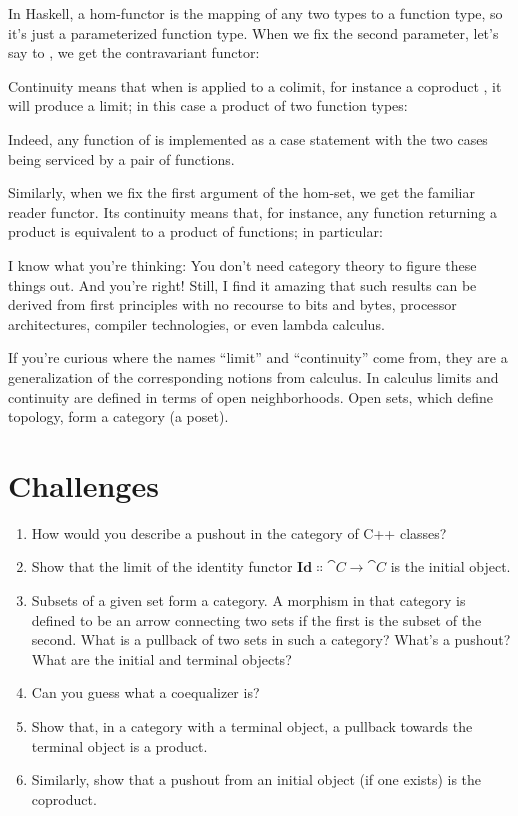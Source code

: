 In Haskell, a hom-functor is the mapping of any two types to a function
type, so it's just a parameterized function type. When we fix the second
parameter, let's say to , we get the contravariant
functor:

Continuity means that when  is applied to a colimit,
for instance a coproduct , it will produce a limit;
in this case a product of two function types:

Indeed, any function of  is implemented as a case
statement with the two cases being serviced by a pair of functions.

Similarly, when we fix the first argument of the hom-set, we get the
familiar reader functor. Its continuity means that, for instance, any
function returning a product is equivalent to a product of functions; in
particular:

I know what you're thinking: You don't need category theory to figure
these things out. And you're right! Still, I find it amazing that such
results can be derived from first principles with no recourse to bits
and bytes, processor architectures, compiler technologies, or even
lambda calculus.

If you're curious where the names ``limit'' and ``continuity'' come
from, they are a generalization of the corresponding notions from
calculus. In calculus limits and continuity are defined in terms of open
neighborhoods. Open sets, which define topology, form a category (a
poset).

\section{Challenges}

\begin{enumerate}
  \tightlist
  \item
        How would you describe a pushout in the category of C++ classes?
  \item
        Show that the limit of the identity functor
        $\mathbf{Id} \Colon \cat{C} \to \cat{C}$ is the initial object.
  \item
        Subsets of a given set form a category. A morphism in that category is
        defined to be an arrow connecting two sets if the first is the subset
        of the second. What is a pullback of two sets in such a category?
        What's a pushout? What are the initial and terminal objects?
  \item
        Can you guess what a coequalizer is?
  \item
        Show that, in a category with a terminal object, a pullback towards
        the terminal object is a product.
  \item
        Similarly, show that a pushout from an initial object (if one exists)
        is the coproduct.
\end{enumerate}
